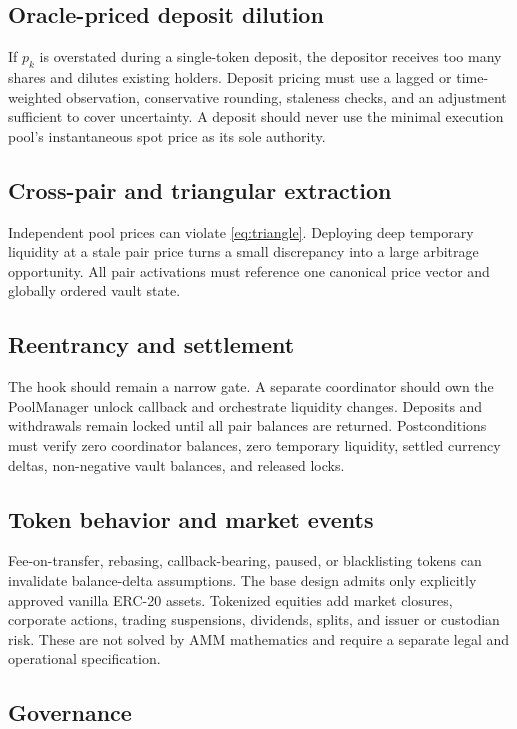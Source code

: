 \documentclass[11pt]{article}
\begin{document}
\subsection{Oracle-priced deposit dilution}

If $p_k$ is overstated during a single-token deposit, the depositor receives too
many shares and dilutes existing holders. Deposit pricing must use a lagged or
time-weighted observation, conservative rounding, staleness checks, and an
adjustment sufficient to cover uncertainty. A deposit should never use the
minimal execution pool's instantaneous spot price as its sole authority.

\subsection{Cross-pair and triangular extraction}

Independent pool prices can violate \cref{eq:triangle}. Deploying deep
temporary liquidity at a stale pair price turns a small discrepancy into a
large arbitrage opportunity. All pair activations must reference one canonical
price vector and globally ordered vault state.

\subsection{Reentrancy and settlement}

The hook should remain a narrow gate. A separate coordinator should own the
PoolManager unlock callback and orchestrate liquidity changes. Deposits and
withdrawals remain locked until all pair balances are returned. Postconditions
must verify zero coordinator balances, zero temporary liquidity, settled
currency deltas, non-negative vault balances, and released locks.

\subsection{Token behavior and market events}

Fee-on-transfer, rebasing, callback-bearing, paused, or blacklisting tokens can
invalidate balance-delta assumptions. The base design admits only explicitly
approved vanilla ERC-20 assets. Tokenized equities add market closures,
corporate actions, trading suspensions, dividends, splits, and issuer or
custodian risk. These are not solved by AMM mathematics and require a separate
legal and operational specification.

\subsection{Governance}
\end{document}
